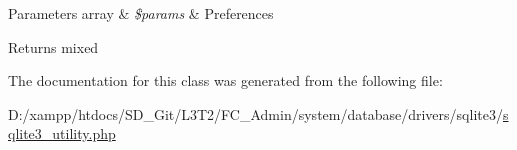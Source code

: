 \begin{DoxyParams}[1]{Parameters}
array & {\em \$params} & Preferences \\
\hline
\end{DoxyParams}
\begin{DoxyReturn}{Returns}
mixed 
\end{DoxyReturn}


The documentation for this class was generated from the following file\+:\begin{DoxyCompactItemize}
\item 
D\+:/xampp/htdocs/\+S\+D\+\_\+\+Git/\+L3\+T2/\+F\+C\+\_\+\+Admin/system/database/drivers/sqlite3/\hyperlink{sqlite3__utility_8php}{sqlite3\+\_\+utility.\+php}\end{DoxyCompactItemize}

